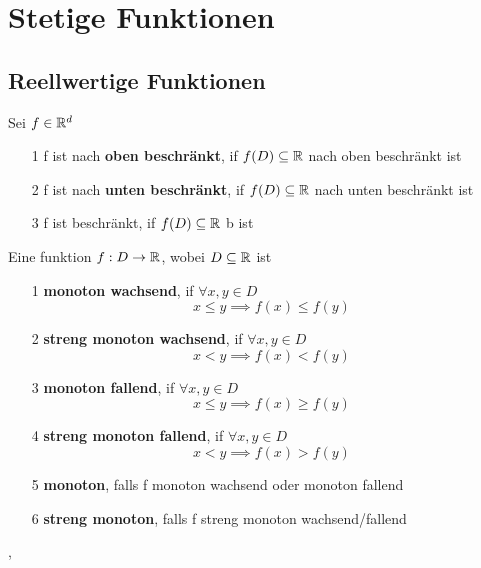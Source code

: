 \section{Stetige Funktionen}
\subsection{Reellwertige Funktionen}
\Def[3.1] Sei \( f \in \mathbb{R}^d\)
\begin{enumerate}
    \item [1] f ist nach \textbf{oben beschränkt}, if \(f(D) \subseteq \mathbb{R} \) nach oben beschränkt ist
    \item [2] f ist nach \textbf{unten beschränkt}, if \(f(D) \subseteq \mathbb{R} \) nach unten beschränkt ist
    \item [3] f ist beschränkt, if \(f(D) \subseteq \mathbb{R} \) b ist
\end{enumerate}
\Def[3.2] Eine funktion \(f: D \rightarrow \mathbb{R}\), wobei \(D \subseteq \mathbb{R}\) ist
\begin{enumerate}
    \item [1] \textbf{monoton wachsend}, if \(\forall x,y \in D\)
    \[x \leq y \implies f(x) \leq f(y) \]
    \item [2] \textbf{streng monoton wachsend}, if \(\forall x,y \in D\)
    \[x < y \implies f(x) < f(y)\]
    \item [3] \textbf{monoton fallend}, if \(\forall x,y \in D\)
    \[x \leq y \implies f(x) \geq f(y)\]
    \item [4] \textbf{streng monoton fallend}, if \(\forall x,y \in D\)
    \[x < y \implies f(x) > f(y)\]
    \item [5] \textbf{monoton}, falls f monoton wachsend oder monoton fallend
    \item [6] \textbf{streng monoton}, falls f streng monoton wachsend/fallend
\end{enumerate}
\sep
